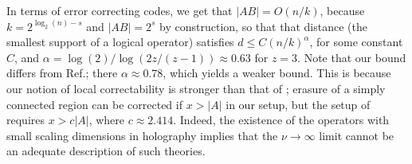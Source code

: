 \documentclass[a4paper,11pt]{article}
\newcommand{\1}{\mathbbm{1}}
\begin{document}
In terms of error correcting codes, we get that $|AB|=O(n/k)$, because $k=2^{\log_2(n)-s}$ and $|AB|=2^s$ by construction,   so that that distance (the smallest support of a logical operator) satisfies $d\leq C(n/k)^\alpha$, for some constant $C$, and $\alpha=\log(2)/\log(2z/(z-1))\approx 0.63$ for $z=3$. Note that our bound differs from Ref.\cite{Pastawski2016a}; there $\alpha \approx 0.78$, which yields a weaker bound. This is because our notion of local correctability is stronger than that of \cite{Pastawski2016a}; erasure of a simply connected region can be corrected if $x>|A|$ in our setup, but the setup of \cite{Pastawski2016a} requires $x>c|A|$, where $c\approx 2.414$. Indeed, the existence of the operators with small scaling dimensions in holography implies that the $\nu\to \infty$ limit cannot be an adequate description of such theories.





\end{document}
